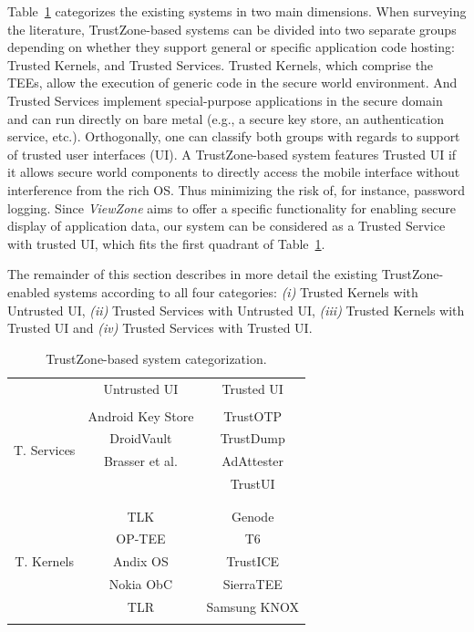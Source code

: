 Table~\ref{tab:trustzonesystemscomparison} categorizes the existing systems in two main dimensions. When surveying the literature, TrustZone-based systems can be divided into two separate groups depending on whether they support general or specific application code hosting: Trusted Kernels, and Trusted Services. Trusted Kernels, which comprise the TEEs, allow the execution of generic code in the secure world environment. And Trusted Services implement special-purpose applications in the secure domain and can run directly on bare metal (e.g., a secure key store, an authentication service, etc.). Orthogonally, one can classify both groups with regards to support of trusted user interfaces (UI). A TrustZone-based system features Trusted UI if it allows secure world components to directly access the mobile interface without interference from the rich OS. Thus minimizing the risk of, for instance, password logging. Since \emph{ViewZone} aims to offer a specific functionality for enabling secure display of application data, our system can be considered as a Trusted Service with trusted UI, which fits the first quadrant of Table~\ref{tab:trustzonesystemscomparison}.

The remainder of this section describes in more detail the existing TrustZone-enabled systems according to all four categories: \emph{(i)} Trusted Kernels with Untrusted UI, \emph{(ii)} Trusted Services with Untrusted UI, \emph{(iii)} Trusted Kernels with Trusted UI and \emph{(iv)} Trusted Services with Trusted UI.

\begin{table}[t!]
	\caption{TrustZone-based system categorization.}
	\label{tab:trustzonesystemscomparison}
	\centering
	\begin{tabular}{ c|c|c| }
		\multicolumn{1}{c}{} 				& \multicolumn{1}{c}{Untrusted UI} 	& \multicolumn{1}{c}{Trusted UI} \\ \cline{2-3}
		\multirow{6}{*}{T. Services} 	&									& \\
		& Android Key Store					& TrustOTP \\
		& DroidVault 						& TrustDump \\
		& Brasser et al.					& AdAttester \\
		& 									& TrustUI \\
		&									& \\
		\cline{2-3}
		\multirow{7}{*}{T. Kernels}	&									& \\
		& TLK								& Genode \\
		& OP-TEE 							& T6 \\
		& Andix OS							& TrustICE \\
		& Nokia ObC							& SierraTEE \\
		& TLR 								& Samsung KNOX \\
		&									& \\
		\cline{2-3}
	\end{tabular}
\end{table}


